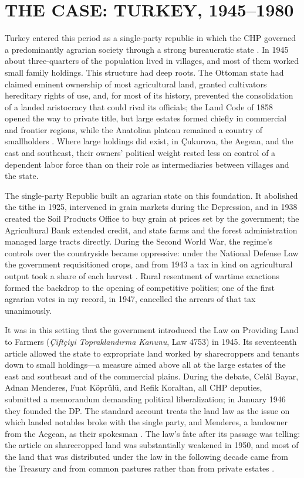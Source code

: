 \documentclass[12pt]{article}
\begin{document}
\section*{THE CASE: TURKEY, 1945--1980}

Turkey entered this period as a single-party republic in which the CHP governed a predominantly agrarian society through a strong bureaucratic state \citep{heper1985,keyder1987}. In 1945 about three-quarters of the population lived in villages, and most of them worked small family holdings. This structure had deep roots. The Ottoman state had claimed eminent ownership of most agricultural land, granted cultivators hereditary rights of use, and, for most of its history, prevented the consolidation of a landed aristocracy that could rival its officials; the Land Code of 1858 opened the way to private title, but large estates formed chiefly in commercial and frontier regions, while the Anatolian plateau remained a country of smallholders \citep{keyder1987,pamuk2018}. Where large holdings did exist, in Çukurova, the Aegean, and the east and southeast, their owners' political weight rested less on control of a dependent labor force than on their role as intermediaries between villages and the state.

The single-party Republic built an agrarian state on this foundation. It abolished the tithe in 1925, intervened in grain markets during the Depression, and in 1938 created the Soil Products Office to buy grain at prices set by the government; the Agricultural Bank extended credit, and state farms and the forest administration managed large tracts directly. During the Second World War, the regime's controls over the countryside became oppressive: under the National Defense Law the government requisitioned crops, and from 1943 a tax in kind on agricultural output took a share of each harvest \citep{keyder1987,zurcher2004}. Rural resentment of wartime exactions formed the backdrop to the opening of competitive politics; one of the first agrarian votes in my record, in 1947, cancelled the arrears of that tax unanimously.

It was in this setting that the government introduced the Law on Providing Land to Farmers (\textit{Çiftçiyi Topraklandırma Kanunu}, Law 4753) in 1945. Its seventeenth article allowed the state to expropriate land worked by sharecroppers and tenants down to small holdings---a measure aimed above all at the large estates of the east and southeast and of the commercial plains. During the debate, Celâl Bayar, Adnan Menderes, Fuat Köprülü, and Refik Koraltan, all CHP deputies, submitted a memorandum demanding political liberalization; in January 1946 they founded the DP. The standard account treats the land law as the issue on which landed notables broke with the single party, and Menderes, a landowner from the Aegean, as their spokesman \citep{karpat1959,keyderpamuk1984,zurcher2004}. The law's fate after its passage was telling: the article on sharecropped land was substantially weakened in 1950, and most of the land that was distributed under the law in the following decade came from the Treasury and from common pastures rather than from private estates \citep{keyder1987}.
\end{document}
